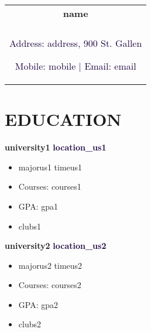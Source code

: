 \documentclass[a4paper,8pt]{article}
\begin{document}
\pagestyle{empty}


\begin{tabularx}{\linewidth}{@{} C @{}}
    \color[HTML]{1C033C} \Huge{\textbf{name}} \\[6pt]
    \\
    \textcolor[HTML]{1C033C}{Address: address, 900 St. Gallen}

    \textcolor[HTML]{1C033C}{Mobile: mobile $|$}
    \textcolor[HTML]{1C033C}{Email: email}
\end{tabularx}

\section{EDUCATION}
\textbf{university1} \hfill \textbf{\textcolor[HTML]{1C033C}{location\_us1}}\\[-3ex]
\begin{itemize}[label={\large\textbullet}, left=0pt, itemsep=0.5ex, parsep=0.5ex]
    \item majorus1 \hfill \color[HTML]{1C033C} timeus1 \\[-3ex]
\end{itemize}
\begin{itemize}[label=$\circ$,itemsep=0.5ex,parsep=0.5ex]
    \item Courses: courses1
    \item GPA: gpa1
    \item clubs1
\end{itemize}

\textbf{university2} \hfill \textbf{\textcolor[HTML]{1C033C}{location\_us2}}\\[-3ex]
\begin{itemize}[label={\large\textbullet}, left=0pt, itemsep=0.5ex, parsep=0.5ex]
    \item majorus2 \hfill \color[HTML]{1C033C} timeus2 \\[-3ex]
\end{itemize}
\begin{itemize}[label=$\circ$,itemsep=0.5ex,parsep=0.5ex]
    \item Courses: courses2
    \item GPA: gpa2
    \item clubs2
\end{itemize}

\end{document}
